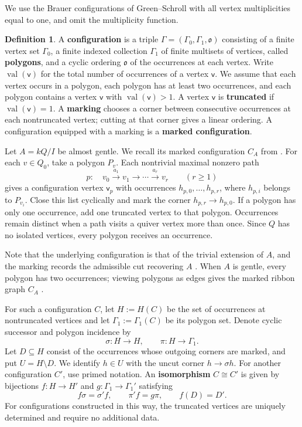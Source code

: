 \documentclass[11pt]{article}
\newcommand{\vv}{\mathsf{v}}
\theoremstyle{definition}
\newtheorem{definition}[theorem]{Definition}
\begin{document}
		We use the Brauer configurations of Green--Schroll \cite[Definition~1.5]{GS17BC} with all vertex multiplicities equal to one, and omit the multiplicity function.

		\begin{definition}\label{definition of marked configuration}
			A \textbf{configuration} is a triple $\Gamma=(\Gamma_0,\Gamma_1,\mathfrak o)$ consisting of a finite vertex set $\Gamma_0$, a finite indexed collection $\Gamma_1$ of finite multisets of vertices, called \textbf{polygons}, and a cyclic ordering $\mathfrak o$ of the occurrences at each vertex. Write $\operatorname{val}(\vv)$ for the total number of occurrences of a vertex $\vv$. 
			We assume that each vertex occurs in a polygon, each polygon has at least two occurrences, and each polygon contains a vertex $\vv$ with $\operatorname{val}(\vv)>1$.
			A vertex $\vv$ is \textbf{truncated} if $\operatorname{val}(\vv)=1$. A \textbf{marking} chooses a corner between consecutive occurrences at each nontruncated vertex; cutting at that corner gives a linear ordering. A configuration equipped with a marking is a \textbf{marked configuration}.
		\end{definition}

		Let $A=kQ/I$ be almost gentle. We recall its marked configuration $C_A$ from \cite{GS19}. For each $v\in Q_0$, take a polygon $P_v$. Each nontrivial maximal nonzero path
		\[
			p:\quad v_0\xrightarrow{a_1}v_1\longrightarrow\cdots
			\xrightarrow{a_r}v_r\qquad(r\geq1)
		\]
		gives a configuration vertex $\vv_p$ with occurrences $h_{p,0},\ldots,h_{p,r}$, where $h_{p,i}$ belongs to $P_{v_i}$. Close this list cyclically and mark the corner $h_{p,r}\to h_{p,0}$. If a polygon has only one occurrence, add one truncated vertex to that polygon. Occurrences remain distinct when a path visits a quiver vertex more than once. Since $Q$ has no isolated vertices, every polygon receives an occurrence.

		Note that the underlying configuration is that of the trivial extension of $A$, and the marking records the admissible cut recovering $A$ \cite{GS19}. When $A$ is gentle, every polygon has two occurrences; viewing polygons as edges gives the marked ribbon graph $C_A$  \cite{Sch15,OPS}.

		For such a configuration $C$, let $H:=H(C)$ be the set of occurrences at nontruncated vertices and let $\Gamma_1:=\Gamma_1(C)$ be its polygon set. Denote cyclic successor and polygon incidence by
		\[
			\sigma:H\longrightarrow H,\qquad
			\pi:H\longrightarrow\Gamma_1.
		\]
		Let $D\subseteq H$ consist of the occurrences whose outgoing corners are marked, and put $U=H\setminus D$. We identify $h\in U$ with the uncut corner $h\to\sigma h$. For another configuration $C'$, use primed notation. An \textbf{isomorphism} $C\cong C'$ is given by bijections $f:H\to H'$ and $g:\Gamma_1\to\Gamma_1'$ satisfying
		\[
			f\sigma=\sigma'f,\qquad \pi'f=g\pi,\qquad f(D)=D'.
		\]
		For configurations constructed in this way, the truncated vertices are uniquely determined and require no additional data.
\end{document}
